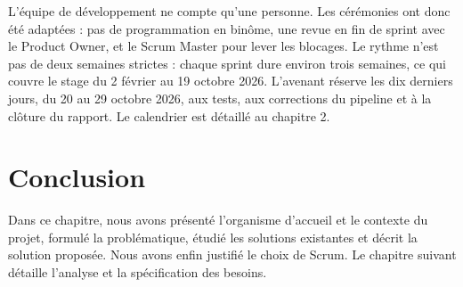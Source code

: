 L'équipe de développement ne compte qu'une personne. Les cérémonies ont donc été adaptées : pas de programmation en binôme, une revue en fin de sprint avec le Product Owner, et le Scrum Master pour lever les blocages. Le rythme n'est pas de deux semaines strictes : chaque sprint dure environ trois semaines, ce qui couvre le stage du 2 février au 19 octobre 2026. L'avenant réserve les dix derniers jours, du 20 au 29 octobre 2026, aux tests, aux corrections du pipeline et à la clôture du rapport. Le calendrier est détaillé au chapitre 2.

\section*{Conclusion}
Dans ce chapitre, nous avons présenté l'organisme d'accueil et le contexte du projet, formulé la problématique, étudié les solutions existantes et décrit la solution proposée. Nous avons enfin justifié le choix de Scrum. Le chapitre suivant détaille l'analyse et la spécification des besoins.
